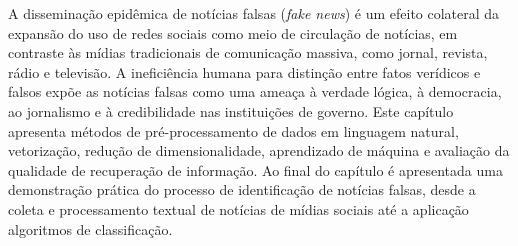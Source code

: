 \documentclass{SBCbookchapter}
\begin{document}
\begin{resumo}

A disseminação epidêmica de notícias falsas (\textit{fake news}) é um efeito colateral da expansão do uso de redes sociais como meio de circulação de notícias, em contraste às mídias tradicionais de comunicação massiva, como jornal, revista, rádio e televisão. A ineficiência humana para distinção entre fatos verídicos e falsos expõe as notícias falsas como uma ameaça à verdade lógica, à democracia, ao jornalismo e à credibilidade nas instituições de governo.
Este capítulo apresenta métodos de pré-processamento de dados em linguagem natural, vetorização, redução de dimensionalidade, aprendizado de máquina e avaliação da qualidade de recuperação de informação. Ao final do capítulo é apresentada uma demonstração prática do processo de identificação de notícias falsas, desde a coleta e processamento textual de notícias de mídias sociais até a aplicação algoritmos de classificação.
\end{resumo}
\end{document}
